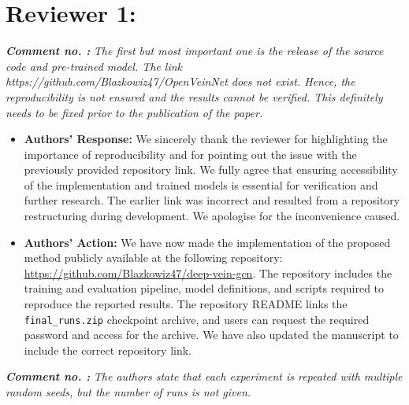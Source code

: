 \documentclass[11pt]{article}
\theoremstyle{remark}
\newcounter{mycounter} %
\newcommand\showReviewcounter{\stepcounter{mycounter}\themycounter}
\begin{document}
\color{blue} 
\color{blue} 
\section*{Reviewer 1:}
\textbf{\textit{Comment no. \showReviewcounter:}} 
\textit{The first but most important one is the release of the source code and pre-trained model. The link https://github.com/Blazkowiz47/OpenVeinNet does not exist. Hence, the reproducibility is not ensured and the results cannot be verified. This definitely needs to be fixed prior to the publication of the paper.}
\color{black}

\begin{itemize}
	\item \textbf{Authors' Response:} 
	We sincerely thank the reviewer for highlighting the importance of reproducibility and for pointing out the issue with the previously provided repository link. We fully agree that ensuring accessibility of the implementation and trained models is essential for verification and further research. The earlier link was incorrect and resulted from a repository restructuring during development. We apologise for the inconvenience caused.

	\item \textbf{Authors' Action:} 
	We have now made the implementation of the proposed method publicly available at the following repository:
	\url{https://github.com/Blazkowiz47/deep-vein-gcn}. 
	The repository includes the training and evaluation pipeline, model definitions, and scripts required to reproduce the reported results. The repository README links the \texttt{final\_runs.zip} checkpoint archive, and users can request the required password and access for the archive. We have also updated the manuscript to include the correct repository link.
\end{itemize}
\color{blue} 
\textbf{\textit{Comment no. \showReviewcounter:}} 
\textit{The authors state that each experiment is repeated with multiple random seeds, but the number of runs is not given.}
\color{black}
\end{document}
